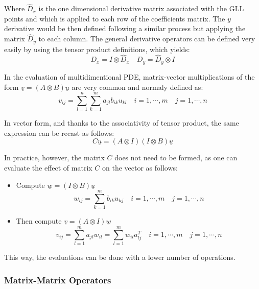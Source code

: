 \documentclass[
]{scrartcl}
\providecommand{\tightlist}{%
  \setlength{\itemsep}{0pt}\setlength{\parskip}{0pt}}
\begin{document}
Where \(\hat{D}_x\) is the one dimensional derivative matrix associated
with the GLL points and which is applied to each row of the coefficients
matrix. The \(y\) derivative would be then defined following a similar
process but applying the matrix \(\hat{D}_y\) to each column. The
general derivative operators can be defined very easily by using the
tensor product definitions, which yields: \begin{equation}
    D_x=I \otimes \hat{D}_x \quad  D_y= \hat{D}_y \otimes I
\end{equation}

In the evaluation of multidimentional PDE, matrix-vector multiplications
of the form \(\underline{v}=(A \otimes B)\underline{u}\) are very common
and normaly defined as: \begin{equation}
    v_{ij}=\sum_{l=1}^{n}\sum_{k=1}^{m} a_{jl} b_{ik} u_{kl} \quad i=1,\cdots,m \quad j=1,\cdots,n
\end{equation}

In vector form, and thanks to the associativity of tensor product, the
same expression can be recast as follows: \begin{equation}
    C\underline{u}=(A \otimes I)(I \otimes B)\underline{u}
\end{equation}

In practice, however, the matrix \(C\) does not need to be formed, as
one can evaluate the effect of matrix \(C\) on the vector as follows:

\begin{itemize}
\tightlist
\item
  Compute \(\underline{w}=(I \otimes B)\underline{u}\) \begin{equation}
        w_{ij}=\sum_{k=1}^{m} b_{ik} u_{kj} \quad i=1,\cdots,m \quad j=1,\cdots,n
  \end{equation}
\item
  Then compute \(\underline{v}=(A \otimes I)\underline{w}\)
  \begin{equation}
        v_{ij}=\sum_{l=1}^{m} a_{jl} w_{il}  = \sum_{l=1}^{m} w_{il} a_{lj}^{T}  \quad i=1,\cdots,m \quad j=1,\cdots,n
  \end{equation}
\end{itemize}

This way, the evaluations can be done with a lower number of operations.

\hypertarget{matrix-matrix-operators}{%
\subsubsection{Matrix-Matrix Operators}\label{matrix-matrix-operators}}
\end{document}
